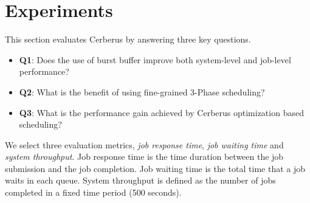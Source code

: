 \section{Experiments}
\label{Sec:Experiments}


This section evaluates Cerberus by answering three key questions.
\begin{itemize}
        \item \textbf{Q1}: Does the use of burst buffer 
        improve both system-level and job-level performance?
        \item \textbf{Q2}: What is the benefit of using 
        fine-grained 3-Phase scheduling?
        \item \textbf{Q3}: What is the performance gain achieved 
        by Cerberus optimization based scheduling?
\end{itemize}



We select three evaluation metrics, \textit{job response time}, \textit{job waiting time} and \textit{system throughput}.
Job response time is the time duration between the job submission and the job completion. Job waiting time is the total time that a job waits in each queue.
System throughput is defined as the number of jobs completed in a fixed time period (500 seconds).

